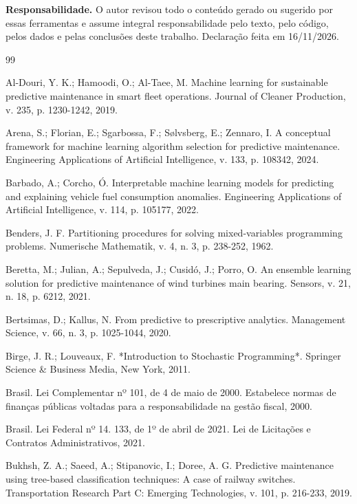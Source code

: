 \documentclass[12pt,a4paper]{article}
\begin{document}
\textbf{Responsabilidade.} O autor revisou todo o conteúdo gerado ou sugerido por essas ferramentas e assume integral responsabilidade pelo texto, pelo código, pelos dados e pelas conclusões deste trabalho. Declaração feita em 16/11/2026.


\begin{thebibliography}{99}

 Al-Douri, Y. K.; Hamoodi, O.; Al-Taee, M. Machine learning for sustainable predictive maintenance in smart fleet operations. Journal of Cleaner Production, v. 235, p. 1230-1242, 2019.

 Arena, S.; Florian, E.; Sgarbossa, F.; Sølvsberg, E.; Zennaro, I. A conceptual framework for machine learning algorithm selection for predictive maintenance. Engineering Applications of Artificial Intelligence, v. 133, p. 108342, 2024.

 Barbado, A.; Corcho, Ó. Interpretable machine learning models for predicting and explaining vehicle fuel consumption anomalies. Engineering Applications of Artificial Intelligence, v. 114, p. 105177, 2022.

 Benders, J. F. Partitioning procedures for solving mixed-variables programming problems. Numerische Mathematik, v. 4, n. 3, p. 238-252, 1962.

 Beretta, M.; Julian, A.; Sepulveda, J.; Cusidó, J.; Porro, O. An ensemble learning solution for predictive maintenance of wind turbines main bearing. Sensors, v. 21, n. 18, p. 6212, 2021.

 Bertsimas, D.; Kallus, N. From predictive to prescriptive analytics. Management Science, v. 66, n. 3, p. 1025-1044, 2020.

 Birge, J. R.; Louveaux, F. *Introduction to Stochastic Programming*. Springer Science \& Business Media, New York, 2011.

 Brasil. Lei Complementar nº 101, de 4 de maio de 2000. Estabelece normas de finanças públicas voltadas para a responsabilidade na gestão fiscal, 2000.

 Brasil. Lei Federal nº 14. 133, de 1º de abril de 2021. Lei de Licitações e Contratos Administrativos, 2021.

 Bukhsh, Z. A.; Saeed, A.; Stipanovic, I.; Doree, A. G. Predictive maintenance using tree-based classification techniques: A case of railway switches. Transportation Research Part C: Emerging Technologies, v. 101, p. 216-233, 2019.


\end{thebibliography}
\end{document}
